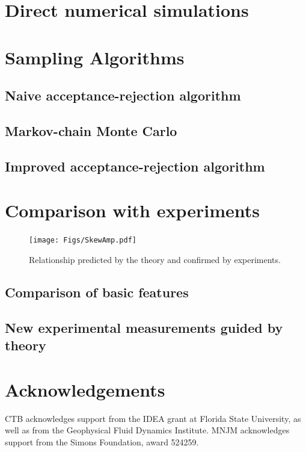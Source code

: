 \documentclass[11pt]{article}
\begin{document}
\section{Direct numerical simulations}

\section{Sampling Algorithms}

\subsection{Naive acceptance-rejection algorithm}

\subsection{Markov-chain Monte Carlo}

\subsection{Improved acceptance-rejection algorithm}


\section{Comparison with experiments}

\begin{figure}%
\begin{center}
\texttt{[image: Figs/SkewAmp.pdf]}
\caption{
Relationship predicted by the theory and confirmed by experiments.
}
\label{AAA}
\end{center}
\end{figure}
 
\subsection{Comparison of basic features}

\subsection{New experimental measurements guided by theory}

\section*{Acknowledgements}
CTB acknowledges support from the IDEA grant at Florida State University, as well as from the Geophysical Fluid Dynamics Institute. 
MNJM acknowledges support from the Simons Foundation, award 524259. 



\end{document}
